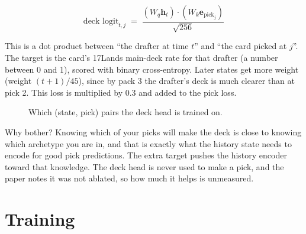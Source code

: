\documentclass[11pt,letterpaper]{article}
\begin{document}
\[
\text{deck logit}_{t,j} \;=\; \frac{(W_q\mathbf{h}_t)\cdot(W_k\mathbf{e}_{\text{pick}_j})}{\sqrt{256}}
\]

This is a dot product between ``the drafter at time $t$'' and ``the card picked at $j$''. The target is
the card's 17Lands main-deck rate for that drafter (a number between 0 and 1), scored with binary
cross-entropy. Later states get more weight (weight $(t+1)/45$), since by pack 3 the drafter's deck is
much clearer than at pick 2. This loss is multiplied by 0.3 and added to the pick loss.

\begin{figure}[!htbp]
\centering
{}
\caption{Which (state, pick) pairs the deck head is trained on.}
\end{figure}

Why bother? Knowing which of your picks will make the deck is close to knowing which archetype you are in,
and that is exactly what the history state needs to encode for good pick predictions. The extra target
pushes the history encoder toward that knowledge. The deck head is never used to make a pick, and the paper
notes it was not ablated, so how much it helps is unmeasured.

\section{Training}
\end{document}
